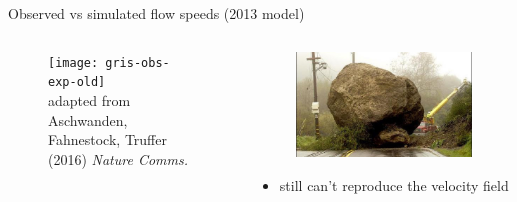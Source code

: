 \documentclass[hide notes,intlimits]{beamer}
\begin{document}
\begin{frame}{Observed vs simulated flow speeds (2013 model)}
  \begin{columns}[c]
    \begin{column}{.6\linewidth}
    \begin{figure}
      \texttt{[image: gris-obs-exp-old]}
      \\ \tiny{adapted from Aschwanden, Fahnestock, Truffer (2016) \textit{Nature Comms.}}
    \end{figure}
    \end{column}
    \begin{column}{.4\linewidth}
      \begin{figure}
        \includegraphics[width=.75\textwidth]{roadblocks}
      \end{figure}
      \begin{itemize}
      \item still can't reproduce the velocity field
      \end{itemize}
    \end{column}
  \end{columns}
  \note[item]{}
\end{frame}
\end{document}
